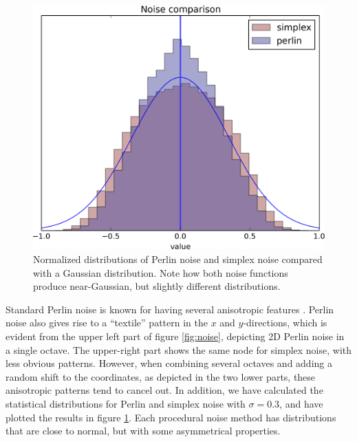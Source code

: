 \documentclass[aps,pre,twocolumn,letterpaper,floatfix,showpacs]{revtex4}
\begin{document}
\begin{figure}
\includegraphics[width=.5\textwidth]{noise_comparison.png}
\caption{Normalized distributions of Perlin noise and simplex noise compared with a
  Gaussian distribution. Note how both noise functions produce
  near-Gaussian, but slightly different distributions.}
\label{fig:properties}
\end{figure}
Standard Perlin noise is known for having several anisotropic features
\citep{lagae:2010}. Perlin noise also gives rise to a ``textile''
pattern in the $x$ and $y$-directions, which is evident from the upper
left part of figure \ref{fig:noise}, depicting 2D Perlin noise in
a single octave. The upper-right part shows the same node for simplex noise,
with less obvious patterns. However, when combining several octaves and adding a random shift to the coordinates,
as depicted in the two lower parts, these anisotropic patterns tend to cancel
out.  In addition, we have calculated the statistical distributions for Perlin and simplex noise
with $\sigma = 0.3$, and have plotted the results in figure \ref{fig:properties}.
Each procedural noise method has distributions that are close to normal, 
but with some asymmetrical properties. 
\end{document}
